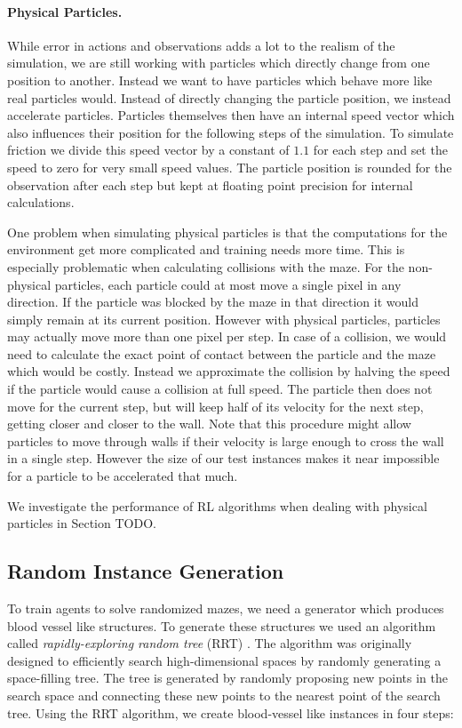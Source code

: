 \paragraph{Physical Particles.}
While error in actions and observations adds a lot to the realism of the simulation, we are still working with particles which directly change from one position to another. Instead we want to have particles which behave more like real particles would. Instead of directly changing the particle position, we instead accelerate particles. Particles themselves then have an internal speed vector which also influences their position for the following steps of the simulation. To simulate friction we divide this speed vector by a constant of $1.1$ for each step and set the speed to zero for very small speed values. The particle position is rounded for the observation after each step but kept at floating point precision for internal calculations.

One problem when simulating physical particles is that the computations for the environment get more complicated and training needs more time. This is especially problematic when calculating collisions with the maze. For the non-physical particles, each particle could at most move a single pixel in any direction. If the particle was blocked by the maze in that direction it would simply remain at its current position. However with physical particles, particles may actually move more than one pixel per step. In case of a collision, we would need to calculate the exact point of contact between the particle and the maze which would be costly. Instead we approximate the collision by halving the speed if the particle would cause a collision at full speed. The particle then does not move for the current step, but will keep half of its velocity for the next step, getting closer and closer to the wall. Note that this procedure might allow particles to move through walls if their velocity is large enough to cross the wall in a single step. However the size of our test instances makes it near impossible for a particle to be accelerated that much.

We investigate the performance of RL algorithms when dealing with physical particles in Section TODO.

\subsection{Random Instance Generation} \label{sec:RandomInstanceGeneration}
To train agents to solve randomized mazes, we need a generator which produces blood vessel like structures. To generate these structures we used an algorithm called \textit{rapidly-exploring random tree} (RRT) \cite{lavalle1998rapidly}. The algorithm was originally designed to efficiently search high-dimensional spaces by randomly generating a space-filling tree. The tree is generated by randomly proposing new points in the search space and connecting these new points to the nearest point of the search tree. Using the RRT algorithm, we create blood-vessel like instances in four steps:

